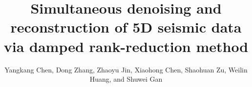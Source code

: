 
\title{Simultaneous denoising and reconstruction of 5D seismic data via damped rank-reduction method}

\renewcommand{\thefootnote}{\fnsymbol{footnote}}
\author{Yangkang Chen\footnotemark[1], Dong Zhang\footnotemark[2], Zhaoyu Jin\footnotemark[3], Xiaohong Chen\footnotemark[2], Shaohuan Zu\footnotemark[2], Weilin Huang\footnotemark[2] , and Shuwei Gan\footnotemark[2]}
\address{
\footnotemark[1]Bureau of Economic Geology \\
John A. and Katherine G. Jackson School of Geosciences \\
The University of Texas at Austin \\
University Station, Box X \\
Austin, TX 78713-8924 \\
Email: ykchen@utexas.edu \\
\footnotemark[2] State Key Laboratory of Petroleum Resources and Prospecting \\
China University of Petroleum \\
Fuxue Road 18th\\
Beijing, China, 102200 \\
zhangdongconan@163.com\&chenxh@cup.edu.cn \& shaohuanzu@gmail.com \&  cup\_hwl@126.com\&gsw19900128@126.com  \\ 
\footnotemark[3]School of Geosciences \\
University of Edinburgh \\
Edinburgh,UK, EH9 3JW \\
s1263999@sms.ed.ac.uk
}


\maketitle

